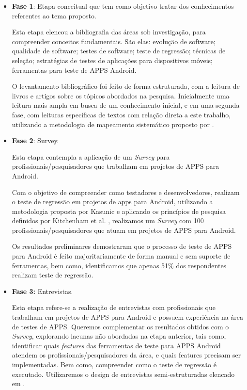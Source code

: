 \begin{itemize}
  \item \textbf{Fase 1}: Etapa conceitual que tem como objetivo tratar dos conhecimentos referentes ao tema proposto.
  
  Esta etapa elencou a bibliografia das áreas sob investigação, para compreender conceitos fundamentais. São elas: evolução de software; qualidade de software; testes de software; teste de regressão; técnicas de seleção; estratégias de testes de aplicações para dispositivos móveis; ferramentas para teste de \ac{APPS} Android.
  
  O levantamento bibliográfico foi feito de forma estruturada, com a leitura de livros e artigos sobre os tópicos abordados na pesquisa. Inicialmente uma leitura mais ampla em busca de um conhecimento inicial, e em uma segunda fase, com leituras específicas de textos com relação direta a este trabalho, utilizando a metodologia de mapeamento sistemático proposto por .
  
  \item \textbf{Fase 2}: Survey.
  
  Esta etapa contempla a aplicação de um \textit{Survey} para profissionais/pesquisadores que trabalham em projetos de \ac{APPS} para Android.
  
  Com o objetivo de compreender como testadores e desenvolvedores, realizam o teste de regressão em projetos de apps para Android, utilizando a metodologia proposta por Kasunic  e aplicando os princípios de pesquisa definidos por Kitchenham et al. , realizamos um \textit{Survey} com 100 profissionais/pesquisadores que atuam em projetos de \ac{APPS} para Android. 
  
  Os resultados preliminares demostraram que o processo de teste de \ac{APPS} para Android é feito majoritariamente de forma manual e sem suporte de ferramentas, bem como, identificamos que apenas 51\% dos respondentes realizam teste de regressão.
 
  \item \textbf{Fase 3:} Entrevistas.
  
  Esta etapa refere-se a realização de entrevistas com profissionais que trabalham em projetos de \ac{APPS} para Android e possuem experiência na área de testes de \ac{APPS}. Queremos complementar os resultados obtidos com o \textit{Survey}, explorando lacunas não abordadas na etapa anterior, tais como, identificar quais \textit{features} das ferramentas de teste para \ac{APPS} Android atendem os profissionais/pesquisadores da área, e quais features precisam ser implementadas. Bem como, compreender como o teste de regressão é executado. Utilizaremos o design de entrevistas semi-estruturadas elencado em .
  

\end{itemize}
